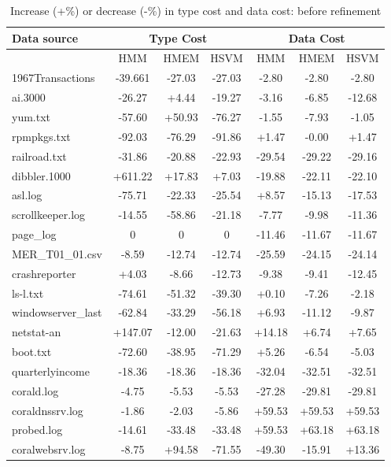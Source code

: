 \begin{table}[th]
\begin{center}
\begin{tabular}{|l||c|c|c||c|c|c|}\hline
Data source & \multicolumn{3}{|c||}{Type Cost} &
\multicolumn{3}{|c|}{Data Cost}\\ \hline & HMM & HMEM & HSVM & HMM &
HMEM & HSVM \\ \hline 1967Transactions & -39.661 & -27.03 & -27.03 &
-2.80 & -2.80 & -2.80    \\\hline ai.3000 & -26.27 & +4.44 & -19.27
& -3.16 & -6.85 & -12.68 \\ \hline yum.txt & -57.60 & +50.93 &
-76.27 & -1.55 & -7.93 & -1.05  \\ \hline rpmpkgs.txt & -92.03 &
-76.29 & -91.86 & +1.47 & -0.00 & +1.47 \\ \hline railroad.txt &
-31.86 & -20.88 & -22.93 & -29.54 & -29.22 & -29.16   \\ \hline
dibbler.1000 & +611.22 & +17.83 & +7.03 & -19.88 & -22.11 & -22.10
\\ \hline asl.log & -75.71 & -22.33 & -25.54 & +8.57 & -15.13 &
-17.53 \\ \hline scrollkeeper.log & -14.55 & -58.86 & -21.18 & -7.77
& -9.98 & -11.36  \\ \hline page\_log & 0 & 0 & 0 & -11.46 & -11.67
& -11.67 \\ \hline MER\_T01\_01.csv & -8.59 & -12.74 & -12.74 &
-25.59 & -24.15 & -24.14 \\ \hline crashreporter & +4.03 & -8.66 &
-12.73 & -9.38 & -9.41 & -12.45 \\ \hline ls-l.txt & -74.61 & -51.32
& -39.30 & +0.10 & -7.26 & -2.18 \\ \hline windowserver\_last &
-62.84 & -33.29 & -56.18 & +6.93 & -11.12 & -9.87
\\ \hline netstat-an & +147.07 & -12.00 & -21.63 & +14.18 & +6.74 &
+7.65 \\ \hline boot.txt & -72.60 & -38.95 & -71.29 & +5.26 & -6.54
& -5.03 \\ \hline quarterlyincome & -18.36 & -18.36 & -18.36 &
-32.04 & -32.51 & -32.51    \\ \hline corald.log & -4.75 & -5.53 &
-5.53 & -27.28 & -29.81 & -29.81   \\ \hline coraldnssrv.log  &
-1.86 & -2.03 & -5.86 & +59.53 & +59.53 & +59.53 \\ \hline
probed.log & -14.61 & -33.48 & -33.48 & +59.53 & +63.18 & +63.18 \\
\hline
coralwebsrv.log & -8.75 & +94.58 & -71.55 & -49.30 & -15.91 & +13.36   \\
               \hline
\end{tabular}
\caption{Increase (+\%) or decrease (-\%) in type cost and data
cost: before refinement} \label{tab:complexity1}
\end{center}
\end{table}

